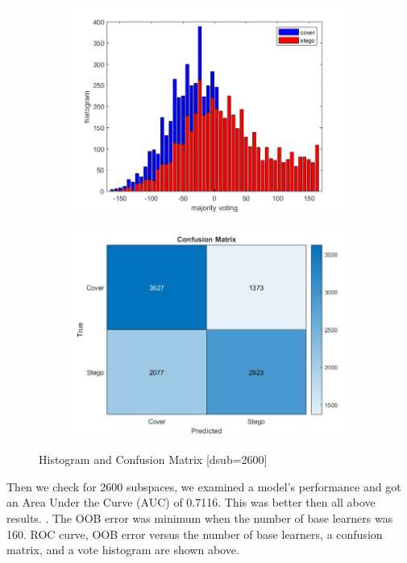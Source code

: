 \begin{figure}[H]
    \begin{subfigure}[b]{0.5\textwidth}
        \includegraphics[width=\textwidth]{img/2600/histo2600.jpg}
    \end{subfigure}
    \hfill
    \begin{subfigure}[b]{0.5\textwidth}
        \includegraphics[width=\textwidth]{img/2600/consuse2600.jpg}
    \end{subfigure}
    \caption{Histogram and Confusion Matrix [dsub=2600]}
\end{figure}
Then we check for 2600 subspaces, we examined a model's performance and got an Area Under the Curve (AUC) of 0.7116. This was better then all above results. . The OOB error was minimum when the number of base learners was 160.  ROC curve, OOB error versus the number of base learners, a confusion matrix, and a vote histogram are shown above.
\clearpage
